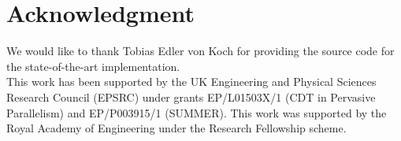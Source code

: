 \documentclass[conference,10pt]{IEEEtran}
\begin{document}
\maketitle












%







\section*{Acknowledgment}
  We would like to thank Tobias Edler von Koch for providing the source
code for the state-of-the-art implementation.
  \\
  This work has been supported by the UK Engineering and Physical Sciences Research Council (EPSRC) under grants EP/L01503X/1 (CDT in Pervasive Parallelism) and EP/P003915/1 (SUMMER).
  This work was supported by the Royal Academy of Engineering under the Research Fellowship scheme.


%








\clearpage
\balance



\end{document}
